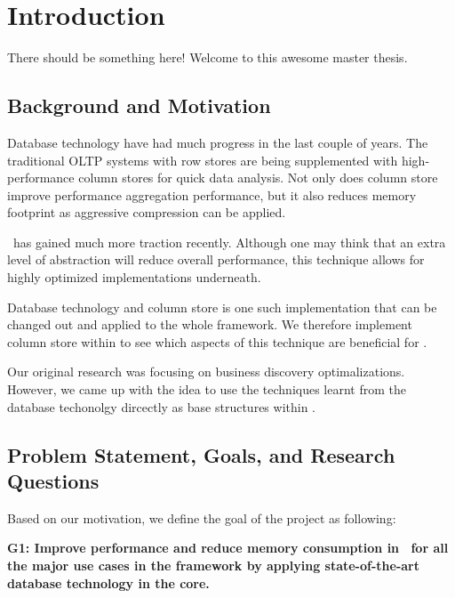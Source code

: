\chapter{Introduction}
\label{chap:introduction}
There should be something here! Welcome to this awesome master thesis.

\section{Background and Motivation}
\label{sec:Background and Motivation}
Database technology have had much progress in the last couple of years. The traditional OLTP systems with row stores are being supplemented with high-performance column stores for quick data analysis. Not only does column store improve performance aggregation performance, but it also reduces memory footprint as aggressive compression can be applied.

\mdd~has gained much more traction recently. Although one may think that an extra level of abstraction will reduce overall performance, this technique allows for highly optimized implementations underneath. 

Database technology and column store is one such implementation that can be changed out and applied to the whole framework. We therefore implement column store within \genusSoftware to see which aspects of this technique are beneficial for \mdd.


Our original research was focusing on business discovery optimalizations. However, we came up with the idea to use the techniques learnt from the database techonolgy dircectly as base structures within \genusSoftware.

\section{Problem Statement, Goals, and Research Questions}
\label{sec:Problem Statement, Goals, and Research Questions}
Based on our motivation, we define the goal of the project as following: 

\textbf{G1: Improve performance and reduce memory consumption in \genusSoftware~for all the major use cases in the framework by applying state-of-the-art database technology in the core.}

